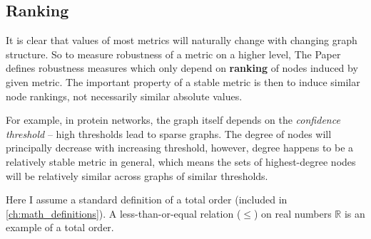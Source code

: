 \subsection{Ranking}\label{sec:ranking}

It is clear that values of most metrics will naturally change with changing graph structure.
So to measure robustness of a metric on a higher level, The Paper defines robustness measures which only depend on \textbf{ranking} of nodes induced by given metric.
The important property of a stable metric is then to induce similar node rankings, not necessarily similar absolute values.

For example, in protein networks, the graph itself depends on the \textsl{confidence threshold} -- high thresholds lead to sparse graphs.
The degree of nodes will principally decrease with increasing threshold, however, degree happens to be a relatively stable metric in general, which means the sets of highest-degree nodes will be relatively similar across graphs of similar thresholds.

%

Here I assume a standard definition of a total order (included in \cref{ch:math_definitions}).
A less-than-or-equal relation ($\leq$) on real numbers $\mathbb{R}$ is an example of a total order.

